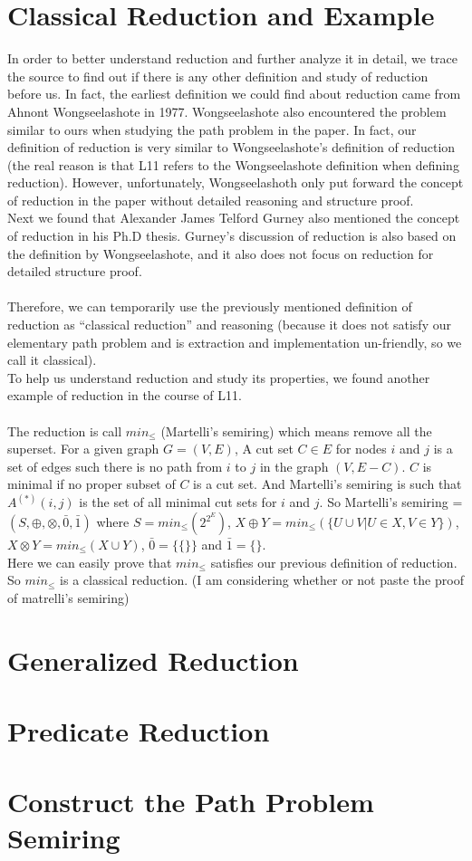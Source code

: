 \documentclass[a4paper,10pt]{article}
\begin{document}
\section{Classical Reduction and Example}
In order to better understand reduction and further analyze it in detail, we trace the source to find out if there is any other definition and study of reduction before us. 
In fact, the earliest definition we could find about reduction came from Ahnont Wongseelashote in 1977\cite{WONGSEELASHOTE197955}. Wongseelashote also encountered the problem similar to ours when studying the path problem in the paper. In fact, our definition of reduction is very similar to Wongseelashote's definition of reduction (the real reason is that L11 refers to the Wongseelashote definition when defining reduction). However, unfortunately, Wongseelashoth only put forward the concept of reduction in the paper without detailed reasoning and structure proof.\\
Next we found that Alexander James Telford Gurney also mentioned the concept of reduction in his Ph.D thesis\cite{gurney_construction_2010}. Gurney's discussion of reduction is also based on the definition by Wongseelashote, and it also does not focus on reduction for detailed structure proof.\\\\
Therefore, we can temporarily use the previously mentioned definition of reduction as “classical reduction” and reasoning (because it does not satisfy our elementary path problem and is extraction and implementation un-friendly, so we call it classical).\\
To help us understand reduction and study its properties, we found another example of reduction in the course of L11.\\\\
The reduction is call $min_{\leq}$ (Martelli’s semiring)\cite{martelli_gaussian_1976} which means remove all the superset.
For a given graph $G = (V,E)$, A cut set $C \in E$ for nodes $i$ and $j$ is a set of edges such there is no path from $i$ to $j$ in the graph $(V, E - C)$. $C$ is minimal if no proper subset of $C$ is a cut set. And Martelli’s semiring is such that $A^{(*)}(i, j)$ is the set of all minimal cut sets for $i$ and $j$. 
So Martelli’s semiring =$(S,\oplus,\otimes,\bar0,\bar1)$ where $S = min_\leq(2^{2^E})$, $X\oplus Y = min_\leq(\{U \cup V | U \in X, V \in Y\})$, $X\otimes Y = min_\leq(X \cup Y)$, $\bar0 = \{\{\}\}$ and $\bar1 = \{\}$.\\
Here we can easily prove that $min_\leq$ satisfies our previous definition of reduction. So $min_\leq$ is a classical reduction. (I am considering whether or not paste the proof of matrelli's semiring)
\section{Generalized Reduction}

\section{Predicate Reduction}
\section{Construct the Path Problem Semiring}

\medskip

 

\end{document}
